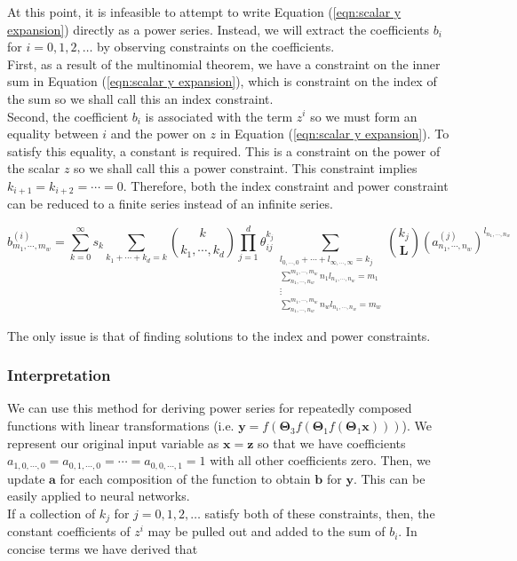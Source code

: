 {\color{red} At this point, it is infeasible to attempt to write Equation (\ref{eqn:scalar y expansion}) directly as a power series. Instead, we will extract the coefficients $b_i$ for $i = 0, 1, 2, \ldots$ by observing constraints on the coefficients.\\

First, as a result of the multinomial theorem, we have a constraint on the inner sum in Equation (\ref{eqn:scalar y expansion}), which is constraint on the index of the sum so we shall call this an index constraint.\\

Second, the coefficient $b_i$ is associated with the term $z^i$ so we must form an equality between $i$ and the power on $z$ in Equation (\ref{eqn:scalar y expansion}). To satisfy this equality, a constant is required. This is a constraint on the power of the scalar $z$ so we shall call this a power constraint. This constraint implies $k_{i + 1} = k_{i + 2} = \cdots = 0$. Therefore, both the index constraint and power constraint can be reduced to a finite series instead of an infinite series.}

\begin{equation}
    b^{(i)}_{m_1, \cdots, m_w} = \sum_{k=0}^{\infty} s_k \sum_{k_1 + \cdots + k_d = k} \binom{k}{k_1, \cdots, k_d} \prod_{j=1}^{d} \theta_{ij}^{k_j} \sum_{\substack{l_{0, \cdots, 0} + \cdots + l_{\infty, \cdots, \infty} = k_j \\ \sum_{n_1, \cdots, n_w}^{m_1, \cdots, m_w} n_1 l_{n_1, \cdots, n_w} = m_1 \\ \vdots \\ \sum_{n_1, \cdots, n_w}^{m_1, \cdots, m_w} n_w l_{n_1, \cdots, n_w} = m_w}} \binom{k_j}{\mathbf{L}} (a^{(j)}_{n_1, \cdots, n_w})^{l_{n_1, \cdots, n_w}}
\end{equation}

The only issue is that of finding solutions to the index and power constraints.

\subsubsection{Interpretation}

We can use this method for deriving power series for repeatedly composed functions with linear transformations (i.e. $\mathbf{y} = f(\mathbf{\Theta}_3 f(\mathbf{
\Theta}_1 f(\mathbf{\Theta}_1 \mathbf{x})))$). We represent our original input variable as $\mathbf{x} = \mathbf{z}$ so that we have coefficients $a_{1, 0, \cdots, 0} = a_{0, 1, \cdots, 0} = \cdots = a_{0, 0, \cdots, 1} = 1$ with all other coefficients zero. Then, we update $\mathbf{a}$ for each composition of the function to obtain $\mathbf{b}$ for $\mathbf{y}$. This can be easily applied to neural networks.\\
If a collection of $k_j$ for $j = 0, 1, 2, \ldots$ satisfy both of these constraints, then, the constant coefficients of $z^i$ may be pulled out and added to the sum of $b_i$. In concise terms we have derived that

